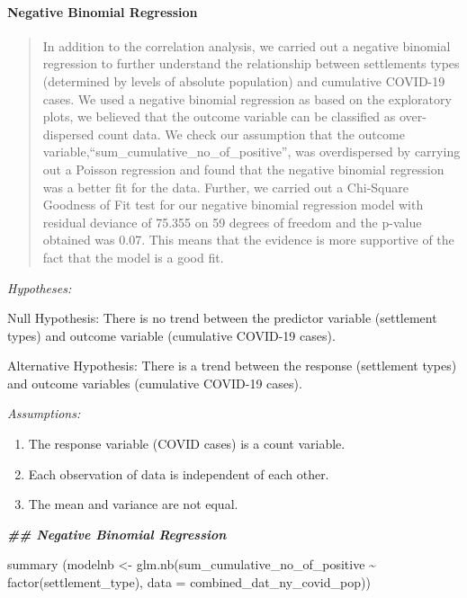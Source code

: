\documentclass[
  12pt,
]{article}
\newenvironment{Shaded}{\begin{snugshade}}{\end{snugshade}}
\newcommand{\AttributeTok}[1]{\textcolor[rgb]{0.77,0.63,0.00}{#1}}
\newcommand{\DocumentationTok}[1]{\textcolor[rgb]{0.56,0.35,0.01}{\textbf{\textit{#1}}}}
\newcommand{\FunctionTok}[1]{\textcolor[rgb]{0.00,0.00,0.00}{#1}}
\newcommand{\NormalTok}[1]{#1}
\newcommand{\OtherTok}[1]{\textcolor[rgb]{0.56,0.35,0.01}{#1}}
\newcommand{\SpecialCharTok}[1]{\textcolor[rgb]{0.00,0.00,0.00}{#1}}
\providecommand{\tightlist}{%
  \setlength{\itemsep}{0pt}\setlength{\parskip}{0pt}}
\begin{document}
\hypertarget{negative-binomial-regression}{%
\paragraph{Negative Binomial
Regression}\label{negative-binomial-regression}}

\begin{quote}
In addition to the correlation analysis, we carried out a negative
binomial regression to further understand the relationship between
settlements types (determined by levels of absolute population) and
cumulative COVID-19 cases. We used a negative binomial regression as
based on the exploratory plots, we believed that the outcome variable
can be classified as over-dispersed count data. We check our assumption
that the outcome variable,``sum\_cumulative\_no\_of\_positive'', was
overdispersed by carrying out a Poisson regression and found that the
negative binomial regression was a better fit for the data. Further, we
carried out a Chi-Square Goodness of Fit test for our negative binomial
regression model with residual deviance of 75.355 on 59 degrees of
freedom and the p-value obtained was 0.07. This means that the evidence
is more supportive of the fact that the model is a good fit.
\end{quote}

\emph{Hypotheses:}

Null Hypothesis: There is no trend between the predictor variable
(settlement types) and outcome variable (cumulative COVID-19 cases).

Alternative Hypothesis: There is a trend between the response
(settlement types) and outcome variables (cumulative COVID-19 cases).

\emph{Assumptions:}

\begin{enumerate}
\def\labelenumi{\arabic{enumi}.}
\tightlist
\item
  The response variable (COVID cases) is a count variable.
\item
  Each observation of data is independent of each other.
\item
  The mean and variance are not equal.
\end{enumerate}

\begin{Shaded}
\begin{Highlighting}[]
\DocumentationTok{\#\# Negative Binomial Regression}

\FunctionTok{summary}\NormalTok{ (modelnb }\OtherTok{\textless{}{-}}
           \FunctionTok{glm.nb}\NormalTok{(sum\_cumulative\_no\_of\_positive }\SpecialCharTok{\textasciitilde{}} \FunctionTok{factor}\NormalTok{(settlement\_type),}
                  \AttributeTok{data =}\NormalTok{ combined\_dat\_ny\_covid\_pop))}
\end{Highlighting}
\end{Shaded}
\end{document}
